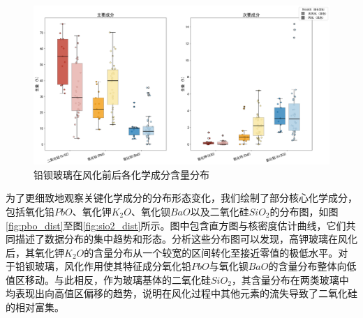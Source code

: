 \begin{figure}[H]
	\centering
	\includegraphics[width=\textwidth]{figs/3问题一/铅钡玻璃成分分布.png}
	\caption{铅钡玻璃在风化前后各化学成分含量分布}
	\label{fig:铅钡玻璃成分分布}
\end{figure}


为了更细致地观察关键化学成分的分布形态变化，我们绘制了部分核心化学成分，包括氧化铅$PbO$、氧化钾$K_2O$、氧化钡$BaO$以及二氧化硅$SiO_2$的分布图，如图\ref{fig:pbo_dist}至图\ref{fig:sio2_dist}所示。图中包含直方图与核密度估计曲线，它们共同描述了数据分布的集中趋势和形态。分析这些分布图可以发现，高钾玻璃在风化后，其氧化钾$K_2O$的含量分布从一个较宽的区间转化至接近零值的极低水平。对于铅钡玻璃，风化作用使其特征成分氧化铅$PbO$与氧化钡$BaO$的含量分布整体向低值区移动。与此相反，作为玻璃基体的二氧化硅$SiO_2$，其含量分布在两类玻璃中均表现出向高值区偏移的趋势，说明在风化过程中其他元素的流失导致了二氧化硅的相对富集。


